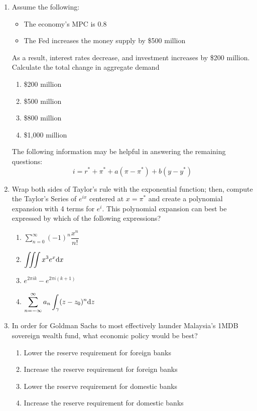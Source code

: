 \begin{enumerate}


  \item Assume the following:
        \begin{itemize}
          \item The economy's MPC is 0.8
          \item The Fed increases the money supply by \$500 million
        \end{itemize}
        As a result, interest rates decrease, and investment increases
        by \$200 million. Calculate the total change in aggregate demand

        \begin{enumerate}
          \item \$200 million
          \item \$500 million
          \item \$800 million
          \item \$1,000 million
        \end{enumerate}

        \columnbreak
        The following information may be helpful in answering the remaining questions:
        \[ i = r^* + \pi^* + a(\pi - \pi^*) + b(y - y^*) \]


  \item Wrap both sides of Taylor's rule with the exponential function;
        then, compute the Taylor's Series of $e^{ix}$ centered at $x=\pi^*$
        and create a polynomial expansion with 4 terms for $e^i$. This
        polynomial expansion can best be expressed by which of the following
        expressions?
        \begin{enumerate}
          \item $\displaystyle \sum_{n=0}^{\infty} (-1)^n \dfrac{x^n}{n!}$
          \item $\displaystyle \MultiIntegral{3} x^3 e^x \differential x$
          \item $e^{2 \pi i k} - e^{2 \pi i (k + 1)}$
          \item $\displaystyle\sum_{n=-\infty}^{\infty} a_n \int_\gamma (z - z_0)^n \differential z$
        \end{enumerate}


  \item In order for Goldman Sachs to most effectively launder
        Malaysia's \textsc{1MDB} sovereign wealth fund, what economic policy
        would be best?
        \begin{enumerate}
          \item Lower the reserve requirement for foreign banks
          \item Increase the reserve requirement for foreign banks
          \item Lower the reserve requirement for domestic banks
          \item Increase the reserve requirement for domestic banks
        \end{enumerate}


\end{enumerate}
